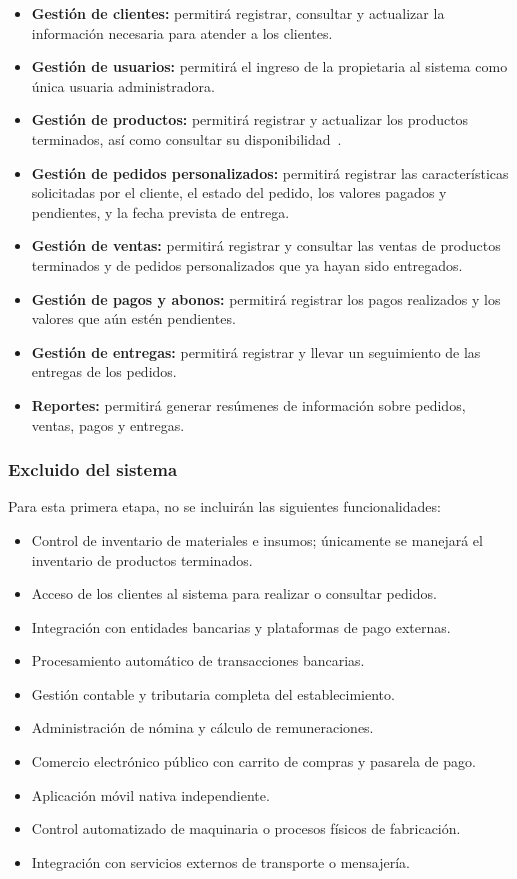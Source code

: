 \documentclass[11pt,a4paper]{article}
\begin{document}
	\begin{itemize}
		\item \textbf{Gestión de clientes:} permitirá registrar, consultar y actualizar la información necesaria para atender a los clientes.
		\item \textbf{Gestión de usuarios:} permitirá el ingreso de la propietaria al sistema como única usuaria administradora.
		\item \textbf{Gestión de productos:} permitirá registrar y actualizar los productos terminados, así como consultar su disponibilidad~\cite{saltosbaren2025inventory}.
		\item \textbf{Gestión de pedidos personalizados:} permitirá registrar las características solicitadas por el cliente, el estado del pedido, los valores pagados y pendientes, y la fecha prevista de entrega.
		\item \textbf{Gestión de ventas:} permitirá registrar y consultar las ventas de productos terminados y de pedidos personalizados que ya hayan sido entregados.
		\item \textbf{Gestión de pagos y abonos:} permitirá registrar los pagos realizados y los valores que aún estén pendientes.
		\item \textbf{Gestión de entregas:} permitirá registrar y llevar un seguimiento de las entregas de los pedidos.
		\item \textbf{Reportes:} permitirá generar resúmenes de información sobre pedidos, ventas, pagos y entregas.
	\end{itemize}
	
	\subsubsection{Excluido del sistema}
	
	Para esta primera etapa, no se incluirán las siguientes funcionalidades:
	
	\begin{itemize}
		\item Control de inventario de materiales e insumos; únicamente se manejará el inventario de productos terminados.
		\item Acceso de los clientes al sistema para realizar o consultar pedidos.
		\item Integración con entidades bancarias y plataformas de pago externas.
		\item Procesamiento automático de transacciones bancarias.
		\item Gestión contable y tributaria completa del establecimiento.
		\item Administración de nómina y cálculo de remuneraciones.
		\item Comercio electrónico público con carrito de compras y pasarela de pago.
		\item Aplicación móvil nativa independiente.
		\item Control automatizado de maquinaria o procesos físicos de fabricación.
		\item Integración con servicios externos de transporte o mensajería.
	\end{itemize}
	
\end{document}
